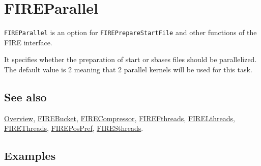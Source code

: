 \documentclass[../FeynHelpersManual.tex]{subfiles}
\begin{document}
\begin{Shaded}
\begin{Highlighting}[]
 
\end{Highlighting}
\end{Shaded}

\hypertarget{fireparallel}{
\section{FIREParallel}\label{fireparallel}}

\texttt{FIREParallel} is an option for \texttt{FIREPrepareStartFile} and
other functions of the FIRE interface.

It specifies whether the preparation of start or sbases files should be
parallelized. The default value is 2 meaning that 2 parallel kernels
will be used for this task.

\subsection{See also}

\hyperlink{toc}{Overview}, \hyperlink{firebucket}{FIREBucket},
\hyperlink{firecompressor}{FIRECompressor},
\hyperlink{firefthreads}{FIREFthreads},
\hyperlink{firelthreads}{FIRELthreads},
\hyperlink{firethreads}{FIREThreads},
\hyperlink{firepospref}{FIREPosPref},
\hyperlink{firesthreads}{FIRESthreads}.

\subsection{Examples}
\end{document}
